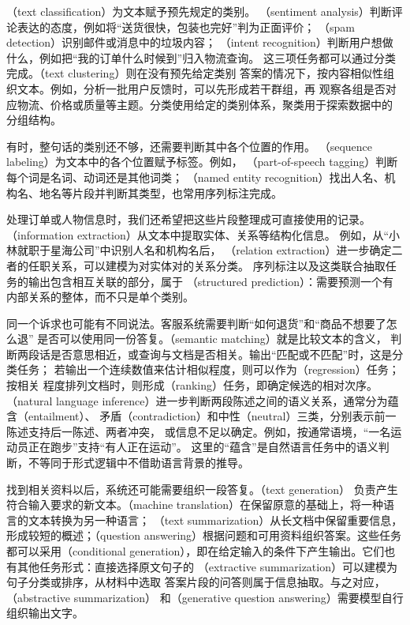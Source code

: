 （text classification）为文本赋予预先规定的类别。
（sentiment analysis）判断评论表达的态度，例如将“送货很快，包装也完好”判为正面评价；
（spam detection）识别邮件或消息中的垃圾内容；
（intent recognition）判断用户想做什么，例如把“我的订单什么时候到”归入物流查询。
这三项任务都可以通过分类完成。（text clustering）则在没有预先给定类别
答案的情况下，按内容相似性组织文本。例如，分析一批用户反馈时，可以先形成若干群组，再
观察各组是否对应物流、价格或质量等主题。分类使用给定的类别体系，聚类用于探索数据中的
分组结构。

有时，整句话的类别还不够，还需要判断其中各个位置的作用。
（sequence labeling）为文本中的各个位置赋予标签。例如，
（part-of-speech tagging）判断每个词是名词、动词还是其他词类；
（named entity recognition）找出人名、机构名、地名等片段并判断其类型，也常用序列标注完成。

处理订单或人物信息时，我们还希望把这些片段整理成可直接使用的记录。
（information extraction）从文本中提取实体、关系等结构化信息。
例如，从“小林就职于星海公司”中识别人名和机构名后，
（relation extraction）进一步确定二者的任职关系，可以建模为对实体对的关系分类。
序列标注以及这类联合抽取任务的输出包含相互关联的部分，属于
（structured prediction）：需要预测一个有内部关系的整体，而不只是单个类别。

同一个诉求也可能有不同说法。客服系统需要判断“如何退货”和“商品不想要了怎么退”
是否可以使用同一份答复。（semantic matching）就是比较文本的含义，
判断两段话是否意思相近，或查询与文档是否相关。输出“匹配或不匹配”时，这是分类任务；
若输出一个连续数值来估计相似程度，则可以作为（regression）任务；按相关
程度排列文档时，则形成（ranking）任务，即确定候选的相对次序。
（natural
language inference）进一步判断两段陈述之间的语义关系，通常分为蕴含（entailment）、
矛盾（contradiction）和中性（neutral）三类，分别表示前一陈述支持后一陈述、两者冲突，
或信息不足以确定。例如，按通常语境，“一名运动员正在跑步”支持“有人正在运动”。
这里的“蕴含”是自然语言任务中的语义判断，不等同于形式逻辑中不借助语言背景的推导。

找到相关资料以后，系统还可能需要组织一段答复。（text generation）
负责产生符合输入要求的新文本。（machine
translation）在保留原意的基础上，将一种语言的文本转换为另一种语言；
（text summarization）从长文档中保留重要信息，形成较短的概述；（question
answering）根据问题和可用资料组织答案。这些任务都可以采用（conditional
generation），即在给定输入的条件下产生输出。它们也有其他任务形式：直接选择原文句子的
（extractive summarization）可以建模为句子分类或排序，从材料中选取
答案片段的问答则属于信息抽取。与之对应，（abstractive summarization）
和（generative question answering）需要模型自行组织输出文字。

